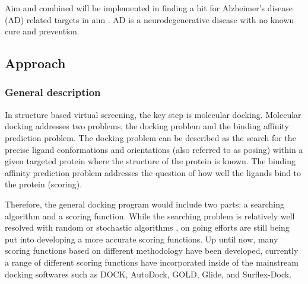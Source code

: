 Aim  and  combined will be implemented in finding a hit for Alzheimer's disease (AD) related targets in aim . AD is a neurodegenerative disease with no known cure and prevention. 




\subsection{Approach}

\subsubsection{General description}

In structure based virtual screening, the key step is molecular docking. 
Molecular docking addresses two problems, the docking problem and the binding affinity prediction problem.
The docking problem can be described as the search for the precise ligand conformations and orientations (also referred to as posing) within a given targeted protein where the structure of the protein is known.
The binding affinity prediction problem addresses the question of how well the ligands bind to the protein (scoring). 

Therefore, the general docking program would include two parts: 
a searching algorithm and a scoring function. 
While the searching problem is relatively well resolved with random or stochastic algorithms \cite{Rezacova2008}, 
on going efforts are still being put into developing a more accurate scoring functions. 
Up until now, many scoring functions based on different methodology have been developed, currently a range of different scoring functions have incorporated inside of the mainstream docking softwares such as DOCK\cite{dock}, AutoDock\cite{autodock}, GOLD\cite{gold}, Glide\cite{glide}, and Surflex-Dock\cite{surflex}.

